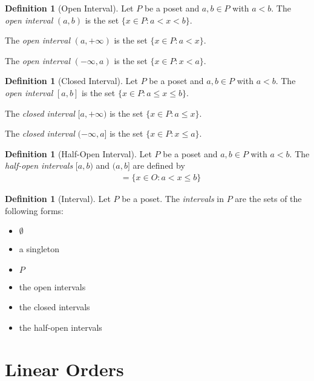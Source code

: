 \documentclass{report}
\theoremstyle{definition}
\newtheorem{definition}[axiom]{Definition}
\begin{document}
    \begin{definition}[Open Interval]
        Let $P$ be a poset and $a, b \in P$ with $a < b$. The \emph{open interval} $(a,b)$
        is the set $\{ x \in P : a < x < b \}$.

        The \emph{open interval} $(a, +\infty)$ is the set $\{ x \in P : a < x \}$.

        The \emph{open interval} $(-\infty, a)$ is the set $\{ x \in P : x < a \}$.
    \end{definition}

    \begin{definition}[Closed Interval]
        Let $P$ be a poset and $a, b \in P$ with $a < b$. The \emph{open interval} $[a,b]$
        is the set $\{ x \in P : a \leq x \leq b \}$.

        The \emph{closed interval} $[a, +\infty)$ is the set $\{ x \in P : a \leq x \}$.

        The \emph{closed interval} $(-\infty, a]$ is the set $\{ x \in P : x \leq a \}$.
    \end{definition}

    \begin{definition}[Half-Open Interval]
        Let $P$ be a poset and $a, b \in P$ with $a < b$. The \emph{half-open intervals} $[a,b)$
        and $(a,b]$ are defined by
        \begin{align*}
            [a,b) & = \{ x \in P : a \leq x < b \} \\
            (a,b] & = \{ x \in O : a < x \leq b \}
        \end{align*}
    \end{definition}

    \begin{definition}[Interval]
        Let $P$ be a poset. The \emph{intervals} in $P$ are the sets of the following forms:
        \begin{itemize}
            \item $\emptyset$
            \item a singleton
            \item $P$
            \item the open intervals
            \item the closed intervals
            \item the half-open intervals
        \end{itemize}
    \end{definition}
    \section{Linear Orders}
\end{document}
